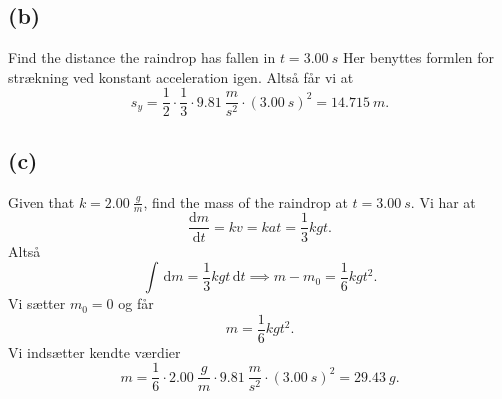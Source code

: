 \documentclass[12pt]{article}
\begin{document}
\subsection*{(b)}
Find the distance the raindrop has fallen in $t = \qty{3,00}{s}$ 
\bigbreak
Her benyttes formlen for strækning ved konstant acceleration igen. Altså får vi at
\[
s_y = \frac{1}{2}\cdot \frac{1}{3}\cdot \qty{9,81}{\frac{m}{s^2}}  \cdot \left( \qty{3,00}{s} \right) ^2 = \qty{14,715}{m}
.\] 


\subsection*{(c)}
Given that $k = \qty{2,00}{\frac{g}{m}}$, find the mass of the raindrop
at $t = \qty{3,00}{s}$.
\bigbreak
Vi har at
\[
\frac{\mathrm{d}m}{\mathrm{d}t} = kv = kat = \frac{1}{3}kgt
.\] 
Altså
\[
  \int \, \mathrm{d}m = \frac{1}{3}kgt \, \mathrm{d}t \implies m - m_0 = \frac{1}{6}kgt^2
.\] 
Vi sætter $m_0 = 0$ og får
 \[
m = \frac{1}{6}kgt^2
.\] 
Vi indsætter kendte værdier
\[
m = \frac{1}{6}\cdot \qty{2,00}{\frac{g}{m}} \cdot \qty{9,81}{\frac{m}{s^2}} \cdot \left( \qty{3,00}{s} \right)^2 = \qty{29,43}{g} 
.\] 
\end{document}
